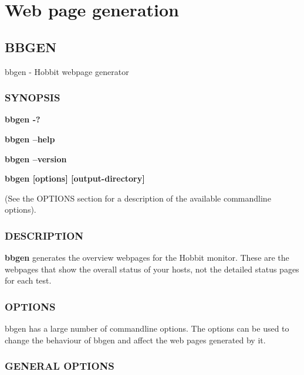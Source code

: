%
\chapter{Web page generation}

%
\newpage
\section{BBGEN}

 bbgen - Hobbit webpage generator \subsection{SYNOPSIS}
\textbf{bbgen -?}
 
\textbf{bbgen --help}
 
\textbf{bbgen --version}
 
\textbf{bbgen [options] [output-directory]}
 
 (See the OPTIONS section for a description of the available commandline options). 

 
\subsection{DESCRIPTION}
\textbf{bbgen}
 generates the overview webpages for the Hobbit monitor. These are the
 webpages that show the overall status of your hosts, not the detailed
 status pages for each test. 


 
\subsection{OPTIONS}
 bbgen has a large number of commandline options. The options can be
 used to change the behaviour of bbgen and affect the web pages
 generated by it. 


 
\subsection{GENERAL OPTIONS}


